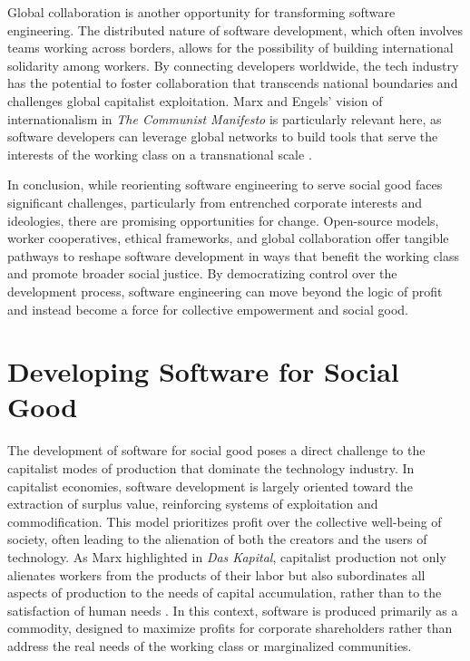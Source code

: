 \begin{refsection}
Global collaboration is another opportunity for transforming software engineering. The distributed nature of software development, which often involves teams working across borders, allows for the possibility of building international solidarity among workers. By connecting developers worldwide, the tech industry has the potential to foster collaboration that transcends national boundaries and challenges global capitalist exploitation. Marx and Engels’ vision of internationalism in \textit{The Communist Manifesto} is particularly relevant here, as software developers can leverage global networks to build tools that serve the interests of the working class on a transnational scale \cite[pp.~86-88]{marx1974}.

In conclusion, while reorienting software engineering to serve social good faces significant challenges, particularly from entrenched corporate interests and ideologies, there are promising opportunities for change. Open-source models, worker cooperatives, ethical frameworks, and global collaboration offer tangible pathways to reshape software development in ways that benefit the working class and promote broader social justice. By democratizing control over the development process, software engineering can move beyond the logic of profit and instead become a force for collective empowerment and social good.

\section{Developing Software for Social Good}

The development of software for social good poses a direct challenge to the capitalist modes of production that dominate the technology industry. In capitalist economies, software development is largely oriented toward the extraction of surplus value, reinforcing systems of exploitation and commodification. This model prioritizes profit over the collective well-being of society, often leading to the alienation of both the creators and the users of technology. As Marx highlighted in \textit{Das Kapital}, capitalist production not only alienates workers from the products of their labor but also subordinates all aspects of production to the needs of capital accumulation, rather than to the satisfaction of human needs \cite[pp.~344-347]{marx2018}. In this context, software is produced primarily as a commodity, designed to maximize profits for corporate shareholders rather than address the real needs of the working class or marginalized communities.


\end{refsection}
